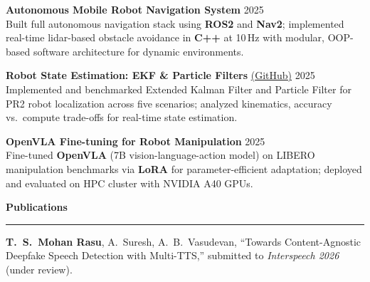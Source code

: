 \documentclass[9pt]{article}
\newcommand{\sect}[1]{\vspace{4pt}\noindent\textbf{\large #1}\vspace{3pt}\hrule\vspace{6pt}}
\begin{document}
\textbf{Autonomous Mobile Robot Navigation System} \hfill 2025\\
Built full autonomous navigation stack using \textbf{ROS2} and \textbf{Nav2}; implemented real-time lidar-based obstacle avoidance in \textbf{C++} at 10\,Hz with modular, OOP-based software architecture for dynamic environments.

\textbf{Robot State Estimation: EKF \& Particle Filters} \href{https://github.com/Thiruloksundar/robot_state_estimation}{(GitHub)} \hfill 2025\\
Implemented and benchmarked Extended Kalman Filter and Particle Filter for PR2 robot localization across five scenarios; analyzed kinematics, accuracy vs.\ compute trade-offs for real-time state estimation.

\textbf{OpenVLA Fine-tuning for Robot Manipulation} \hfill 2025\\
Fine-tuned \textbf{OpenVLA} (7B vision-language-action model) on LIBERO manipulation benchmarks via \textbf{LoRA} for parameter-efficient adaptation; deployed and evaluated on HPC cluster with NVIDIA A40 GPUs.

\sect{Publications}
\textbf{T.\ S.\ Mohan Rasu}, A.\ Suresh, A.\ B.\ Vasudevan, ``Towards Content-Agnostic Deepfake Speech Detection with Multi-TTS,'' submitted to \emph{Interspeech 2026} (under review).
\end{document}
